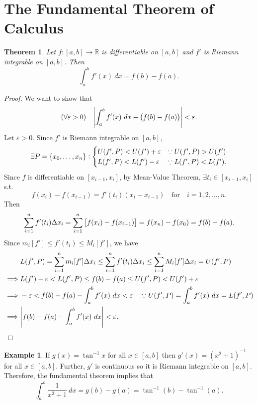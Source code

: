 \documentclass[12pt,openany]{book}
\newtheorem{theorem}{Theorem}[chapter]
\theoremstyle{definition}
\newtheorem{example}{Example}[chapter]
\newcommand{\R}{\mathbb{R}}
\begin{document}
	\newpage
	\section{The Fundamental Theorem of Calculus}
	\begin{tcolorbox}[colframe=thmcolor, title={\color{white}\bf $\star$ Fundamental Theorem of Calculus: 1st form $\star$}]
		\begin{theorem}
			Let $f:[a,b]\to\R$ is differentiable on \([a,b]\) and \(f'\) is Riemann integrable on \([a,b]\). Then \[
			\int_a^bf'(x)\ dx = f(b)- f(a).
			\]
		\end{theorem}
	\end{tcolorbox}
	\begin{proof}
		We want to show that \[
		(\forall\varepsilon>0)\quad\abs{\int_a^b f'(x)\ dx - \del{f(b)-f(a)}}<\varepsilon.
		\]Let \(\varepsilon>0\). Since \(f'\) is Riemann integrable on \([a,b]\), \[
		\exists P=\set{x_0,\dots,x_n}:\begin{cases}
			U(f',P)<U(f')+\varepsilon &\because U(f',P)>U(f')\\
			L(f',P)<L(f')-\varepsilon &\because L(f',P)<L(f').
		\end{cases}
		\] Since \(f\) is differentiable on \([x_{i-1},x_i]\), by Mean-Value Theorem, $\exists t_i\in[x_{i-1},x_i]$ s.t. \[
		f(x_i)-f(x_{i-1})=f'(t_i)(x_{i}-x_{i-1})\quad\text{for}\quad i=1,2,\dots, n.
		\] Then \[
		\sum_{i=1}^nf'(t_i)\Delta x_i=\sum_{i=1}^n\sbr{f(x_i)-f(x_{i-1})}=f(x_n)-f(x_0)=f(b)-f(a).
		\] Since \(m_i[f']\leq f'(t_i)\leq M_i[f']\), we have \begin{align*}
			&L(f',P)=\sum_{i=1}^nm_i[f']\Delta x_i\leq\sum_{i=1}^nf'(t_i)\Delta x_i\leq \sum_{i=1}^nM_i[f']\Delta x_i=U(f',P)\\
			\implies& L(f')-\varepsilon<L(f',P)\leq f(b)-f(a)\leq U(f',P)<U(f')+\varepsilon\\
			\implies&-\varepsilon<f(b)-f(a)-\int_a^bf'(x)\ dx<\varepsilon\quad\because U(f',P)=\int_a^bf'(x)\ dx=L(f',P)\\
			\implies&\abs{f(b)-f(a)-\int_a^bf'(x)\ dx}<\varepsilon.
		\end{align*}
	\end{proof}
	\begin{example}
		If $g(x)=\tan^{-1}x$ for all $x\in[a,b]$ then $g'(x)=(x^2+1)^{-1}$ for all $x\in[a,b]$. Further, $g'$ is continuous so it is Riemann integrable on $[a,b]$. Therefore, the fundamental theorem implies that \[
		\int_a^b\frac{1}{x^2+1}\ dx = g(b)-g(a)=\tan^{-1}(b)-\tan^{-1}(a).
		\]
	\end{example}
	
\end{document}
